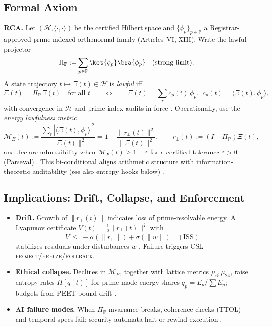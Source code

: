 \documentclass[12pt]{amsart}
\theoremstyle{plain}
\begin{document}
\subsection{Formal Axiom}
\textbf{RCA.} Let $(\mathcal{H},\langle\cdot,\cdot\rangle)$ be the certified Hilbert space and $\{\phi_p\}_{p\in\mathbb{P}}$ a Registrar-approved prime-indexed orthonormal family (Articles~VI, XIII). Write the lawful projector
\[
\Pi_{\mathbb{P}}:=\sum_{p\in\mathbb{P}}\ket{\phi_p}\bra{\phi_p}\quad\text{(strong limit)}.
\]
A state trajectory $t\mapsto \Xi(t)\in\mathcal{H}$ is \emph{lawful} iff
\begin{equation}
\Xi(t)=\Pi_{\mathbb{P}}\Xi(t)\quad\text{for all }t
\qquad\Longleftrightarrow\qquad
\Xi(t)=\sum_{p} c_p(t)\,\phi_p,\ \ c_p(t)=\langle \Xi(t),\phi_p\rangle,
\label{eq:rca-eqv}
\end{equation}
with convergence in $\mathcal{H}$ and prime-index audits in force \cite{rudin1991functional,conway1990functional,lax2002functional}. Operationally, use the \emph{energy lawfulness metric}
\[
\mathcal{M}_E(t):=\frac{\sum_{p}|\langle \Xi(t),\phi_p\rangle|^2}{\|\Xi(t)\|^2}
=1-\frac{\|r_\perp(t)\|^2}{\|\Xi(t)\|^2},\qquad r_\perp(t):=(I-\Pi_{\mathbb{P}})\Xi(t),
\]
and declare admissibility when $\mathcal{M}_E(t)\ge 1-\varepsilon$ for a certified tolerance $\varepsilon>0$ (Parseval) \cite{lax2002functional,rudin1991functional}. This bi-conditional aligns arithmetic structure with information-theoretic auditability (see also entropy hooks below) \cite{cover2006elements}.

\subsection{Implications: Drift, Collapse, and Enforcement}
\begin{itemize}
  \item \textbf{Drift.} Growth of $\|r_\perp(t)\|$ indicates loss of prime-resolvable energy. A Lyapunov certificate $V(t)=\tfrac12\|r_\perp(t)\|^2$ with
  \[
  \dot V\ \le\ -\alpha(\|r_\perp\|)+\sigma(\|w\|)\quad(\text{ISS})
  \]
  stabilizes residuals under disturbances $w$ \cite{khalil2002nonlinear}. Failure triggers CSL \textsc{project}/\textsc{freeze}/\textsc{rollback}.
  \item \textbf{Ethical collapse.} Declines in $\mathcal{M}_E$, together with lattice metrics $\mu_6,\mu_{24}$, raise entropy rates $H[q(t)]$ for prime-mode energy shares $q_p=E_p/\sum E_p$; budgets from PEET bound drift \cite{cover2006elements}.
  \item \textbf{AI failure modes.} When $\Pi_{\mathbb{P}}$-invariance breaks, coherence checks (TTOL) and temporal specs fail; security automata halt or rewind execution \cite{schneider2000enforceable,clarke1999model,baier2008model}.
\end{itemize}
\end{document}
